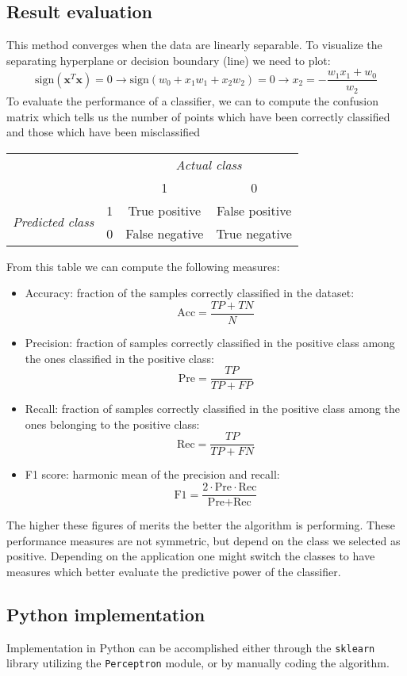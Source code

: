 \subsection{Result evaluation}
This method converges when the data are linearly separable. 
To visualize the separating hyperplane or decision boundary (line) we need to plot:
\[\text{sign}(\textbf{x}^T\textbf{x}) = 0 \rightarrow \text{sign}(w_0 + x_1w_1 + x_2w_2) = 0 \rightarrow x_2=-\dfrac{w_1x_1+w_0}{w_2}\]
To evaluate the performance of a classifier, we can to compute the confusion matrix which tells us the number of points which have been correctly classified and those which have been misclassified
\begin{table}[H]
    \centering
    \begin{tabular}{cccc}
                                                                   & \textit{}              & \multicolumn{2}{c}{\textit{Actual class}}            \\ \cline{3-4} 
    \textit{}                                                      & \multicolumn{1}{c|}{}  & 1              & \multicolumn{1}{c|}{0}              \\ \cline{2-4} 
    \multicolumn{1}{c|}{\multirow{2}{*}{\textit{Predicted class}}} & \multicolumn{1}{c|}{1} & True positive  & \multicolumn{1}{c|}{False positive} \\
    \multicolumn{1}{c|}{}                                          & \multicolumn{1}{c|}{0} & False negative & \multicolumn{1}{c|}{True negative}  \\ \cline{2-4} 
    \end{tabular}
\end{table}
From this table we can compute the following measures: 
\begin{itemize}
    \item Accuracy: fraction of the samples correctly classified in the dataset: 
        \[\text{Acc}=\dfrac{TP+TN}{N}\]
    \item Precision: fraction of samples correctly classified in the positive class among the ones classified in the positive class: 
        \[\text{Pre}=\dfrac{TP}{TP+FP}\]
    \item Recall: fraction of samples correctly classified in the positive class among the ones belonging to the positive class: 
        \[\text{Rec}=\dfrac{TP}{TP+FN}\]
    \item F1 score: harmonic mean of the precision and recall: 
        \[\text{F1}=\dfrac{2\cdot\text{Pre}\cdot\text{Rec}}{\text{Pre}+\text{Rec}}\]
\end{itemize}
The higher these figures of merits the better the algorithm is performing.
These performance measures are not symmetric, but depend on the class we selected as positive.
Depending on the application one might switch the classes to have measures which better evaluate the predictive power of the classifier.

\subsection{Python implementation}
Implementation in Python can be accomplished either through the \texttt{sklearn} library utilizing the \texttt{Perceptron} module, or by manually coding the algorithm.